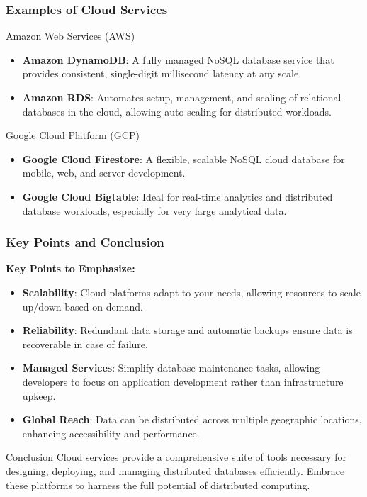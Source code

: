 \documentclass[aspectratio=169]{beamer}
\begin{document}
\begin{frame}[fragile]
  \frametitle{Examples of Cloud Services}
  
  \begin{block}{Amazon Web Services (AWS)}
    \begin{itemize}
      \item \textbf{Amazon DynamoDB}: A fully managed NoSQL database service that provides consistent, single-digit millisecond latency at any scale.
      \item \textbf{Amazon RDS}: Automates setup, management, and scaling of relational databases in the cloud, allowing auto-scaling for distributed workloads.
    \end{itemize}
  \end{block}

  \begin{block}{Google Cloud Platform (GCP)}
    \begin{itemize}
      \item \textbf{Google Cloud Firestore}: A flexible, scalable NoSQL cloud database for mobile, web, and server development.
      \item \textbf{Google Cloud Bigtable}: Ideal for real-time analytics and distributed database workloads, especially for very large analytical data.
    \end{itemize}
  \end{block}
\end{frame}

\begin{frame}[fragile]
  \frametitle{Key Points and Conclusion}
  
  \textbf{Key Points to Emphasize:}
  \begin{itemize}
    \item \textbf{Scalability}: Cloud platforms adapt to your needs, allowing resources to scale up/down based on demand.
    \item \textbf{Reliability}: Redundant data storage and automatic backups ensure data is recoverable in case of failure.
    \item \textbf{Managed Services}: Simplify database maintenance tasks, allowing developers to focus on application development rather than infrastructure upkeep.
    \item \textbf{Global Reach}: Data can be distributed across multiple geographic locations, enhancing accessibility and performance.
  \end{itemize}

  \begin{block}{Conclusion}
    Cloud services provide a comprehensive suite of tools necessary for designing, deploying, and managing distributed databases efficiently. 
    Embrace these platforms to harness the full potential of distributed computing.
  \end{block}
\end{frame}
\end{document}
